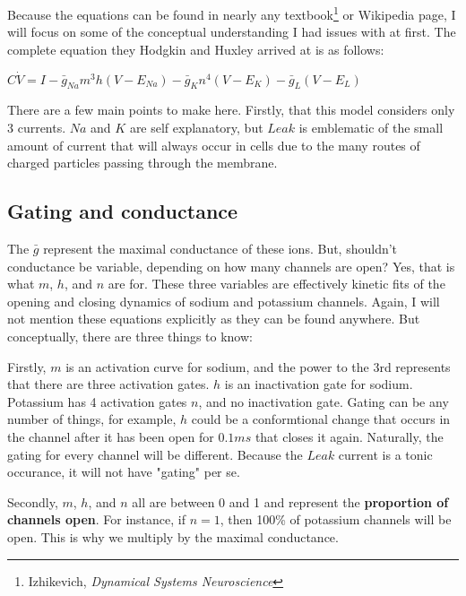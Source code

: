 \documentclass[12pt]{amsart}
\begin{document}
\bigskip

Because the equations can be found in nearly any textbook\footnote{Izhikevich, \textit{Dynamical Systems Neuroscience}} or Wikipedia page, I will focus on some of the conceptual understanding I had issues with at first. The complete equation they Hodgkin and Huxley arrived at is as follows: 

\bigskip

\begin{center}

    $C\dot{V} = I - \bar{g}_{Na}m^3h(V - E_{Na}) - \bar{g}_{K}n^4(V - E_{K}) - \bar{g}_{L}(V - E_{L})$
    
\end{center}

\bigskip 

There are a few main points to make here. Firstly, that this model considers only 3 currents. $Na$ and $K$ are self explanatory, but $Leak$ is emblematic of the small amount of current that will always occur in cells due to the many routes of charged particles passing through the membrane.\newline

\subsection{Gating and conductance} The $\bar{g}$ represent the maximal conductance of these ions. But, shouldn't conductance be variable, depending on how many channels are open? Yes, that is what $m$, $h$, and $n$ are for. These three variables are effectively kinetic fits of the opening and closing dynamics of sodium and potassium channels. Again, I will not mention these equations explicitly as they can be found anywhere. But conceptually, there are three things to know:\newline

Firstly, $m$ is an activation curve for sodium, and the power to the 3rd represents that there are three activation gates. $h$ is an inactivation gate for sodium. Potassium has 4 activation gates $n$, and no inactivation gate. Gating can be any number of things, for example, $h$ could be a conformtional change that occurs in the channel after it has been open for $0.1 ms$ that closes it again. Naturally, the gating for every channel will be different. Because the $Leak$ current is a tonic occurance, it will not have "gating" per se.\newline

Secondly, $m$, $h$, and $n$ all are between 0 and 1 and represent the \textbf{proportion of channels open}. For instance, if $n = 1$, then 100\% of potassium channels will be open. This is why we multiply by the maximal conductance.\newline
\end{document}

